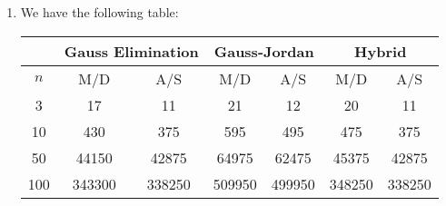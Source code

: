 \documentclass[../../../../Assignments]{subfiles}
\begin{document}
\begin{solution}
\begin{enumerate}[label = \alph*)]
        \item We have the following table:
            \begin{table}[H]
                \centering
                \begin{tabular}{ccccccc}
                    \toprule
                    &  \multicolumn{2}{c}{Gauss Elimination}  &  \multicolumn{2}{c}{Gauss-Jordan}  &  \multicolumn{2}{c}{Hybrid}  \\
                    \midrule
                    \(n\)  &  M/D  &  A/S  &  M/D  &  A/S  &  M/D  &  A/S  \\
                    \midrule
                    3    &  17      &  11      &  21      &  12      &  20      &  11      \\
                    10   &  430     &  375     &  595     &  495     &  475     &  375     \\
                    50   &  44150   &  42875   &  64975   &  62475   &  45375   &  42875   \\
                    100  &  343300  &  338250  &  509950  &  499950  &  348250  &  338250  \\
                    \bottomrule
                \end{tabular}
            \end{table}
    \end{enumerate}
\end{solution}
\end{document}
